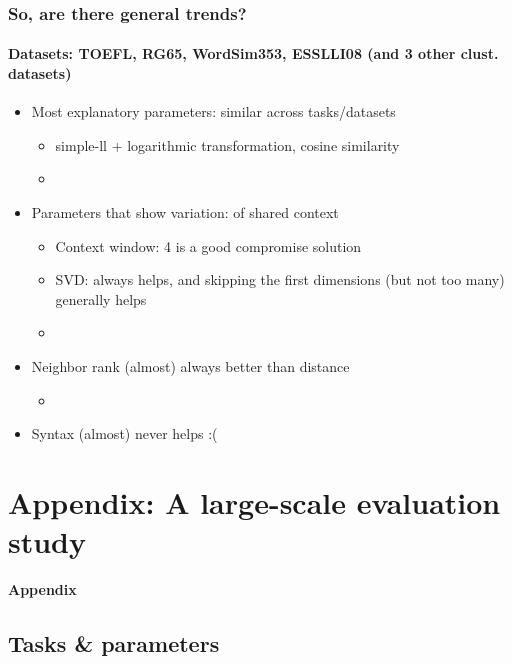 \documentclass[t]{beamer} %
\begin{document}
 \begin{frame}
   \frametitle{So, are there general trends? \citep{Lapesa:Evert:14a}}
   \framesubtitle{Datasets: TOEFL, RG65, WordSim353, ESSLLI08 (and 3 other clust. datasets)}

   \begin{itemize}
   \item<2-> Most explanatory parameters: similar across tasks/datasets
     \begin{itemize}
     \item simple-ll + logarithmic transformation, cosine similarity
     \item[]
     \end{itemize}
   \item<3-> Parameters that show variation:  of shared context
     \begin{itemize}
     \item Context window: 4 is a good compromise solution
     \item SVD: always helps, and skipping the first dimensions (but not too many) generally helps 
     \item[]
     \end{itemize}
   \item<4-> Neighbor rank (almost) always better than distance
     \begin{itemize}
     \item[]
     \end{itemize}
   \item<5-> Syntax (almost) never helps :( \citep{Lapesa:Evert:17}  
   \end{itemize}
 \end{frame}

\section{Appendix: A large-scale evaluation study}

\begin{frame}[c]
  \centering

  \textbf{Appendix}\\
  
  \gap[2]
  \citep{Lapesa:Evert:14a}
\end{frame}

\subsection{Tasks \& parameters}
\end{document}
